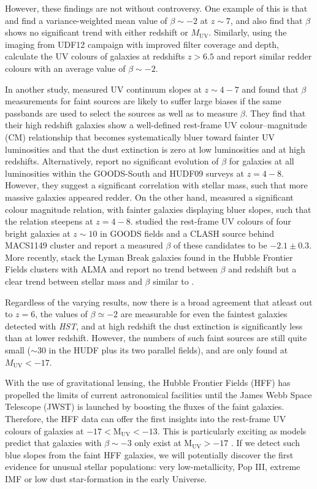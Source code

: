\documentclass[twocolumn]{aastex63}
\begin{document}
However, these findings are not without controversy. One example of this is that \citet{McLure2011} and \citet{Dunlop2012} find a variance-weighted mean value of $\beta\sim-2$ at $z\sim7$, and also find that $\beta$ shows no significant trend with either redshift or $M_{\mathrm{UV}}$. Similarly, using the imaging from UDF12 campaign with improved filter coverage and depth, \citet{Dunlop2013} calculate the UV colours of galaxies at redshifts $z>6.5$ and report similar redder colours with an average value of $\beta\sim-2$.

In another study, \citet{Bouwens2012} measured UV continuum slopes at $z\sim4-7$ and found that $\beta$ measurements for faint sources are likely to suffer large biases if the same passbands are used to select the sources as well as to measure $\beta$. They find that their high redshift  galaxies show a well-defined rest-frame UV colour--magnitude (CM) relationship that becomes systematically bluer toward fainter UV luminosities and that the dust extinction is zero at low luminosities and at high redshifts. Alternatively, \citet{Finkelstein2012} report no significant evolution of $\beta$ for galaxies at all luminosities within the GOODS-South and HUDF09 surveys at $z=4-8$. However, they suggest a significant correlation with stellar mass, such that more massive galaxies appeared redder. On the other hand, \citet{Bouwens2014b} measured a significant colour magnitude relation, with fainter galaxies displaying bluer slopes, such that the relation steepens at $z=4-8$. \citet{Wilkins2016} studied the rest-frame UV colours of four bright galaxies at $z\sim10$ in GOODS fields and a CLASH source behind MACS1149 cluster and report a measured $\beta$ of these candidates to be $-2.1\pm0.3$. More recently, \citet{Carvajal2020} stack the Lyman Break galaxies found in the Hubble Frontier Fields clusters with ALMA and report no trend between $\beta$ and redshift but a clear trend between stellar mass and $\beta$ similar to \citet{Finkelstein2012}.

Regardless of the varying results, now there is a broad agreement that atleast out to $z=6$, the values of $\beta\simeq-2$ are measurable for even the faintest galaxies detected with \textit{HST}, and at high redshift the dust extinction is significantly less than at lower redshift. However, the numbers of such faint sources are still quite small ($\sim30$ in the HUDF plus its two parallel fields), and are only found at $M_{\mathrm{UV}}<-17$. 

With the use of gravitational lensing, the Hubble Frontier Fields (HFF) has propelled the limits of current astronomical facilities until the James Webb Space Telescope (JWST) is launched by boosting the fluxes of the faint galaxies. Therefore, the HFF data can offer the first insights into the rest-frame UV colours of galaxies at $-17<\mathrm{M_{UV}<-13}$. This is particularly exciting as models predict that galaxies with $\beta\sim-3$ only exist at $\mathrm{M_{UV}>-17}$ \citep{Dunlop2013}. If we detect such blue slopes from the faint HFF galaxies, we will potentially discover the first evidence for unusual stellar populations: very low-metallicity, Pop III, extreme IMF or low dust star-formation in the early Universe.
\end{document}
